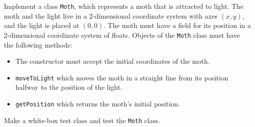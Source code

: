 Implement a class \lstinline{Moth}, which represents a moth that is attracted to light. The moth and the light live in a 2-dimensional coordinate system with axes $(x,y)$, and the light is placed at $(0,0)$. The moth must have a field for its position in a 2-dimensional coordinate system of floats. Objects of the \lstinline{Moth} class must have the following methods:
\begin{itemize}
\item The constructor must accept the initial coordinates of the moth.
\item \lstinline{moveToLight} which moves the moth in a straight line from its position halfway to the position of the light.
\item \lstinline{getPosition} which returns the moth's initial position.
\end{itemize}
Make a white-box test class and test the \lstinline{Moth} class.
